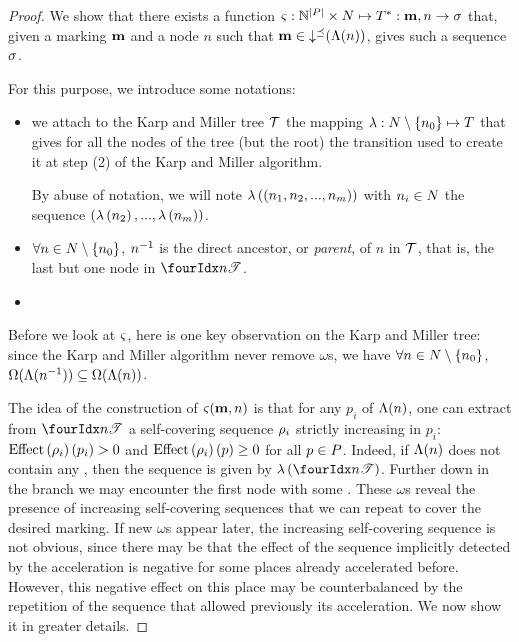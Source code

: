 \begin{proof}
  We show that there exists a function $\Tts : \naturals^{\card{\places}} \times \nodes \mapsto \transitions^* : \mar, n \rightarrow \seqt$ that, given a marking $\mathbf{m}$ and a node $n$ such that $\mathbf{m} \in \operatorname{\downarrow^\preceq}(\operatorname{\Lambda}(n))$, gives such a sequence $\seqt$.

  For this purpose, we introduce some notations:
  \begin{itemize}
    \item we attach to the Karp and Miller tree $\mathcal{T}$ the mapping $\operatorname{\lambda} : N \setminus \{n_0\} \mapsto T$ that gives for all the nodes of the tree (but the root) the transition used to create it at step (2) of the Karp and Miller algorithm.

      By abuse of notation, we will note $\operatorname{\lambda}\left({(n_1, n_2, ..., n_m)}\right)$
      with  $n_i \in N$
      the sequence $(\operatorname{\lambda}\left({n_2}\right), ..., \operatorname{\lambda}\left({n_m}\right))$.
    \item $\forall n \in N \setminus \{n_0\}$, $n^{-1}$ is the direct ancestor, or \emph{parent}, of $n$ in $\mathcal{T}$, that is, the last but one node in $\treepath{n}$.
    \item {}
  \end{itemize}

  Before we look at $\operatorname{\varsigma}$, here is one key observation on the Karp and Miller tree:
  since the Karp and Miller algorithm never remove $\omega$s, we have
  $\forall n \in N \setminus \{n_0\}$, $\operatorname{\Omega}(\operatorname{\Lambda}(n^{-1})) \subseteq \operatorname{\Omega}(\operatorname{\Lambda}(n))$.

  The idea of the construction of $\operatorname{\varsigma}(\mathbf{m},n)$ is that for any \oplace $p_i$ of $\operatorname{\Lambda}(n)$, one can extract from $\treepath{n}$ a self-covering sequence $\iscs{i}$ strictly increasing in $p_i$:
  $\effect{\iscs{i}}(p_i) > 0$ and $\effect{\iscs{i}}(p) \geq 0$ for all $p \in P$.
  Indeed, if $\operatorname{\Lambda}(n)$ does not contain any \oplace, then the sequence is given by $\labt{\treepath{n}}$.
  Further down in the branch we may encounter the first node with some \oplaces.
  These $\omega$s reveal the presence of increasing self-covering sequences that we can repeat to cover the desired marking.
  If new $\omega$s appear later, the  increasing self-covering sequence is not obvious, since there may be that the effect of the sequence implicitly detected by the acceleration is negative for some places already accelerated before.
  However, this negative effect on this place may be counterbalanced by the repetition of the sequence that allowed previously its acceleration.
  We now show it in greater details.


\end{proof}
